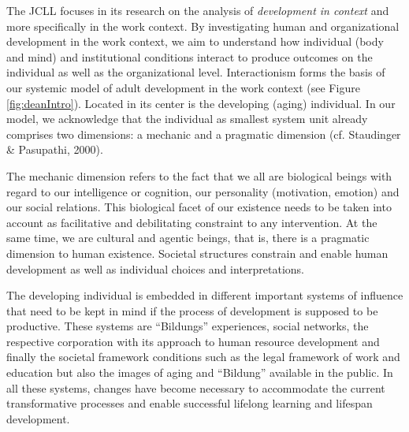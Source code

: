 The JCLL  focuses in its research on the analysis of \textit{development in context} and more specifically in the work context. By investigating human and organizational development in the work context, we aim to understand how individual (body and mind) and institutional conditions interact to produce outcomes on the individual as well as the organizational level. Interactionism forms the basis of our systemic model of adult development in the work context (see Figure \ref{fig:deanIntro}). Located in its center is the developing (aging) individual. In our model, we acknowledge that the individual as smallest system unit already comprises two dimensions: a mechanic and a pragmatic dimension (cf. Staudinger \& Pasupathi, 2000). 




\newpage
The mechanic dimension refers to the fact that we all are biological beings with regard to our intelligence or cognition, our personality (motivation, emotion) and our social relations. This biological facet of our existence needs to be taken into account as facilitative and debilitating constraint to any intervention. At the same time, we are cultural and agentic beings, that is, there is a pragmatic dimension to human existence. Societal structures constrain and enable human development as well as individual choices and interpretations. 




The developing individual is embedded in different important systems of influence that need to be kept in mind if the process of development is supposed to be productive. These systems are ``Bildungs'' experiences, social networks, the respective corporation with its approach to human resource development and finally the societal framework conditions such as the legal framework of work and education but also the images of aging and ``Bildung'' available in the public. In all these systems, changes have become necessary to accommodate the current transformative processes and enable successful lifelong learning and lifespan development. 


